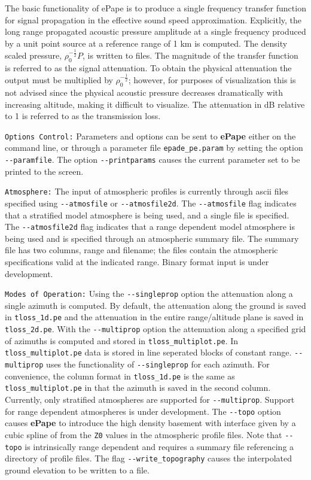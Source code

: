 The basic functionality of ePape is to produce a single frequency transfer function for signal propagation in the effective sound speed approximation. Explicitly, the long range propagated acoustic pressure amplitude at a single frequency produced by a unit point source at a reference range of 1 km is computed. The density scaled pressure, $\rho_0^{-\frac{1}{2}}P$, is written to files. The magnitude of the transfer function is referred to as the signal attenuation. To obtain the physical attenuation the output must be multiplied by $\rho_0^{-\frac{1}{2}}$; however, for purposes of visualization this is not advised since the physical acoustic pressure decreases dramatically with increasing altitude, making it difficult to visualize. The attenuation in dB relative to 1 is referred to as the transmission loss.

\verb+Options Control:+ Parameters and options can be sent to {\bf ePape} either on the command line, or through a parameter file \verb+epade_pe.param+ by setting the option \verb+--paramfile+. The option \verb+--printparams+ causes the current parameter set to be printed to the screen.

\verb+Atmosphere:+ The input of atmospheric profiles is currently through ascii files specified using \verb+--atmosfile+ or \verb+--atmosfile2d+. The \verb+--atmosfile+ flag indicates that a stratified model atmosphere is being used, and a single file is specified. The \verb+--atmosfile2d+ flag indicates that a range dependent model atmosphere is being used and is specified through an atmospheric summary file. The summary file has two columns, range and filename; the files contain the atmospheric specifications valid at the indicated range. Binary format input is under development.
 
\verb+Modes of Operation:+ Using the \verb+--singleprop+ option the attenuation along a single azimuth is computed. By default, the attenuation along the ground is saved in \verb+tloss_1d.pe+ and the attenuation in the entire range/altitude plane is saved in \verb+tloss_2d.pe+. With the \verb+--multiprop+ option the attenuation along a specified grid of azimuths is computed and stored in \verb+tloss_multiplot.pe+. In \verb+tloss_multiplot.pe+ data is stored in line seperated blocks of constant range. \verb+--multiprop+ uses the functionality of \verb+--singleprop+ for each azimuth. For convenience, the column format in \verb+tloss_1d.pe+ is the same as \verb+tloss_multiplot.pe+ in that the azimuth is saved in the second column. Currently, only stratified atmospheres are supported for \verb+--multiprop+. Support for range dependent atmospheres is under development. The \verb+--topo+ option causes {\bf ePape} to introduce the high density basement with interface given by a cubic spline of from the \verb+Z0+ values in the atmospheric profile files. Note that \verb+--topo+ is intrinsically range dependent and requires a summary file referencing a directory of profile files. The flag \verb+--write_topography+ causes the interpolated ground elevation to be written to a file. 

